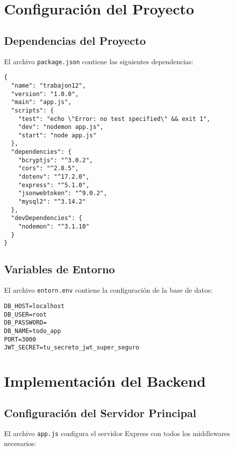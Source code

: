 \documentclass[12pt,a4paper]{article}
\begin{document}
\section{Configuración del Proyecto}

\subsection{Dependencias del Proyecto}

El archivo \texttt{package.json} contiene las siguientes dependencias:

\begin{lstlisting}
{
  "name": "trabajon12",
  "version": "1.0.0",
  "main": "app.js",
  "scripts": {
    "test": "echo \"Error: no test specified\" && exit 1",
    "dev": "nodemon app.js",
    "start": "node app.js"
  },
  "dependencies": {
    "bcryptjs": "^3.0.2",
    "cors": "^2.8.5",
    "dotenv": "^17.2.0",
    "express": "^5.1.0",
    "jsonwebtoken": "^9.0.2",
    "mysql2": "^3.14.2"
  },
  "devDependencies": {
    "nodemon": "^3.1.10"
  }
}
\end{lstlisting}

\subsection{Variables de Entorno}

El archivo \texttt{entorn.env} contiene la configuración de la base de datos:

\begin{lstlisting}
DB_HOST=localhost
DB_USER=root
DB_PASSWORD=
DB_NAME=todo_app
PORT=3000
JWT_SECRET=tu_secreto_jwt_super_seguro
\end{lstlisting}

\section{Implementación del Backend}

\subsection{Configuración del Servidor Principal}

El archivo \texttt{app.js} configura el servidor Express con todos los middlewares necesarios:
\end{document}
